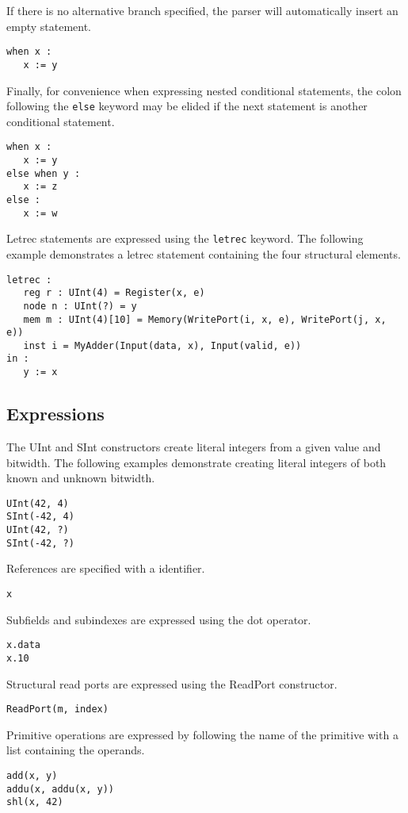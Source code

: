 \documentclass[12pt]{article}
\begin{document}
If there is no alternative branch specified, the parser will automatically insert an empty statement.
\begin{verbatim}
when x :
   x := y
\end{verbatim}

Finally, for convenience when expressing nested conditional statements, the colon following the \verb|else| keyword may be elided if the next statement is another conditional statement.
\begin{verbatim}
when x :
   x := y
else when y :
   x := z
else :
   x := w
\end{verbatim}

Letrec statements are expressed using the \verb|letrec| keyword.
The following example demonstrates a letrec statement containing the four structural elements.
\begin{verbatim}
letrec :
   reg r : UInt(4) = Register(x, e)
   node n : UInt(?) = y
   mem m : UInt(4)[10] = Memory(WritePort(i, x, e), WritePort(j, x, e))
   inst i = MyAdder(Input(data, x), Input(valid, e))
in :
   y := x
\end{verbatim}

\subsection*{Expressions}

The UInt and SInt constructors create literal integers from a given value and bitwidth.
The following examples demonstrate creating literal integers of both known and unknown bitwidth.
\begin{verbatim}
UInt(42, 4)
SInt(-42, 4)
UInt(42, ?)
SInt(-42, ?)
\end{verbatim}

References are specified with a identifier.
\begin{verbatim}
x
\end{verbatim}

Subfields and subindexes are expressed using the dot operator.
\begin{verbatim}
x.data
x.10
\end{verbatim}

Structural read ports are expressed using the ReadPort constructor.
\begin{verbatim}
ReadPort(m, index)
\end{verbatim}

Primitive operations are expressed by following the name of the primitive with a list containing the operands. 
\begin{verbatim}
add(x, y)
addu(x, addu(x, y))
shl(x, 42)
\end{verbatim}
\end{document}
